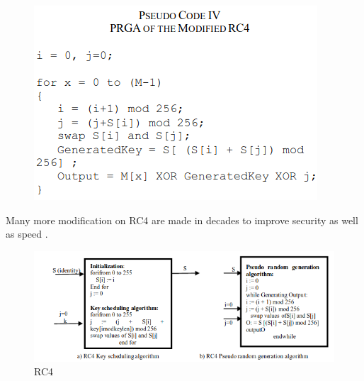 \documentclass[conference]{IEEEtran}
\begin{document}
\begin{figure}[H]
    \centering
    \includegraphics[width=\linewidth]{code4}
\end{figure}
Many more modification on RC4 are made in decades to improve security as well as speed . \newline
\begin{figure}
    \centering
    \includegraphics[width=\linewidth]{RC4}
    \caption{RC4}
    \label{fig:my_label}
\end{figure}
\end{document}
